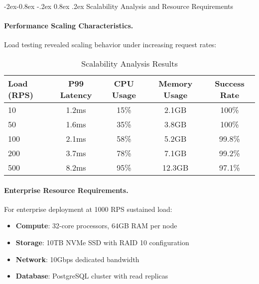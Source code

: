 \documentclass[manuscript,screen,9pt]{acmart}
\makeatletter
\renewcommand\subsubsection{\@startsection{subsubsection}{3}{\z@}%
  {-2ex\@plus -0.8ex \@minus -.2ex}%
  {0.8ex \@plus .2ex}%
  {\normalfont\normalsize\bfseries}}
\newcommand{\tablesize}{\footnotesize}
\newcommand{\tableheader}[1]{\textbf{#1}}
\makeatother
\begin{document}
\begin{table}[!htb]
\subsubsection{Scalability Analysis and Resource Requirements}
\label{subsubsec:scalability_analysis}

\paragraph{Performance Scaling Characteristics.}
Load testing revealed scaling behavior under increasing request rates:

\begin{table}[!htb]
\centering
\caption{Scalability Analysis Results}
\label{tab:scalability_analysis}
\tablesize
\begin{tabular}{@{}lcccc@{}}
\toprule
\tableheader{Load (RPS)} & \tableheader{P99 Latency} & \tableheader{CPU Usage} & \tableheader{Memory Usage} & \tableheader{Success Rate} \\
\midrule
10 & 1.2ms & 15\% & 2.1GB & 100\% \\
50 & 1.6ms & 35\% & 3.8GB & 100\% \\
100 & 2.1ms & 58\% & 5.2GB & 99.8\% \\
200 & 3.7ms & 78\% & 7.1GB & 99.2\% \\
500 & 8.2ms & 95\% & 12.3GB & 97.1\% \\
\bottomrule
\end{tabular}
\end{table}

\paragraph{Enterprise Resource Requirements.}
For enterprise deployment at 1000 RPS sustained load:
\begin{itemize}[leftmargin=*,itemsep=1pt,parsep=1pt]
    \item \textbf{Compute}: 32-core processors, 64GB RAM per node
    \item \textbf{Storage}: 10TB NVMe SSD with RAID 10 configuration
    \item \textbf{Network}: 10Gbps dedicated bandwidth
    \item \textbf{Database}: PostgreSQL cluster with read replicas
\end{itemize}


\end{table}
\end{document}
